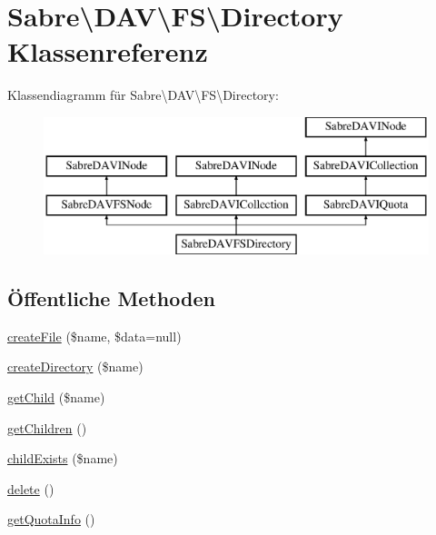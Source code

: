 \hypertarget{class_sabre_1_1_d_a_v_1_1_f_s_1_1_directory}{}\section{Sabre\textbackslash{}D\+AV\textbackslash{}FS\textbackslash{}Directory Klassenreferenz}
\label{class_sabre_1_1_d_a_v_1_1_f_s_1_1_directory}
Klassendiagramm für Sabre\textbackslash{}D\+AV\textbackslash{}FS\textbackslash{}Directory\+:\begin{figure}[H]
\begin{center}
\leavevmode
\includegraphics[height=4.000000cm]{class_sabre_1_1_d_a_v_1_1_f_s_1_1_directory}
\end{center}
\end{figure}
\subsection*{Öffentliche Methoden}
\begin{DoxyCompactItemize}
\item 
\mbox{\hyperlink{class_sabre_1_1_d_a_v_1_1_f_s_1_1_directory_a5f0b8f6641480deb70c711d32e33d59b}{create\+File}} (\$name, \$data=null)
\item 
\mbox{\hyperlink{class_sabre_1_1_d_a_v_1_1_f_s_1_1_directory_ad12fb8ed1ed2c09ecf644068f349a0c8}{create\+Directory}} (\$name)
\item 
\mbox{\hyperlink{class_sabre_1_1_d_a_v_1_1_f_s_1_1_directory_afb99c60f4a32c08a46d6bf3aa77e1089}{get\+Child}} (\$name)
\item 
\mbox{\hyperlink{class_sabre_1_1_d_a_v_1_1_f_s_1_1_directory_ab955171be88f9c130fd8d71f5d271aab}{get\+Children}} ()
\item 
\mbox{\hyperlink{class_sabre_1_1_d_a_v_1_1_f_s_1_1_directory_a30d9098d57f5e0ffb0cdb782f2a22ec0}{child\+Exists}} (\$name)
\item 
\mbox{\hyperlink{class_sabre_1_1_d_a_v_1_1_f_s_1_1_directory_a3ee9ab9286688f9cb541f919f5ac82d5}{delete}} ()
\item 
\mbox{\hyperlink{class_sabre_1_1_d_a_v_1_1_f_s_1_1_directory_aea57550df5c833e8c056451f364ea2de}{get\+Quota\+Info}} ()
\end{DoxyCompactItemize}

